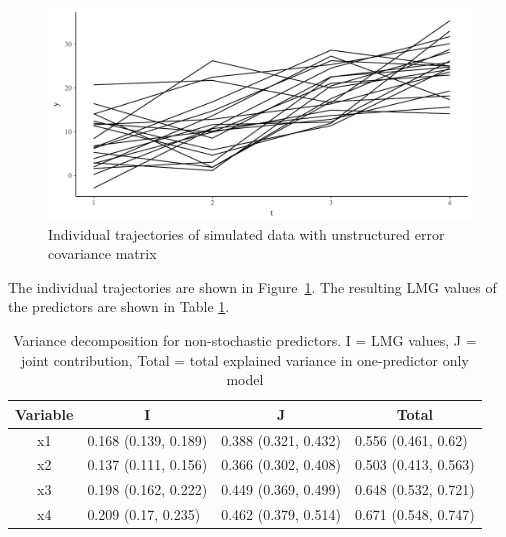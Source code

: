 \documentclass[11pt,a4paper,twoside]{book}\usepackage[]{graphicx}\usepackage[]{color}
\newenvironment{knitrout}{}{} %
\begin{document}
\begin{knitrout}
\color{fgcolor}\begin{figure}

{\centering \includegraphics[width=\textwidth-3cm]{figure/ch04_figsimdata_repeated_unstruct_plot-1} 

}

\caption[Individual trajectories of simulated data with unstructured error covariance matrix]{Individual trajectories of simulated data with unstructured error covariance matrix}\label{fig:simdata.repeated.unstruct.plot}
\end{figure}


\end{knitrout}




The individual trajectories are shown in Figure~\ref{fig:simdata.repeated.unstruct.plot}. The resulting LMG values of the predictors are shown in Table \ref{tbl:repeated.unstructured}.

\begin{table}[h]
\caption{Variance decomposition for non-stochastic predictors. I = LMG values, J = joint contribution, Total = total explained variance in one-predictor only model}
\centering
\begin{tabular}{clll}
  \toprule
  \multicolumn{1}{c}{\textbf{Variable}} & \multicolumn{1}{c}{\textbf{I}} &\multicolumn{1}{c}{\textbf{J}} & \multicolumn{1}{c}{\textbf{Total}} \\
  \hline
x1 & 0.168 (0.139, 0.189)  & 0.388 (0.321, 0.432)   & 0.556 (0.461, 0.62)  \\ 
x2 & 0.137 (0.111, 0.156)  & 0.366 (0.302, 0.408)   & 0.503 (0.413, 0.563)  \\ 
x3 & 0.198 (0.162, 0.222)  & 0.449 (0.369, 0.499)   & 0.648 (0.532, 0.721)  \\ 
x4 & 0.209 (0.17, 0.235)  & 0.462 (0.379, 0.514)   & 0.671 (0.548, 0.747)  \\ 
   \bottomrule
\end{tabular}
\label{tbl:repeated.unstructured}
\end{table}
\end{document}
